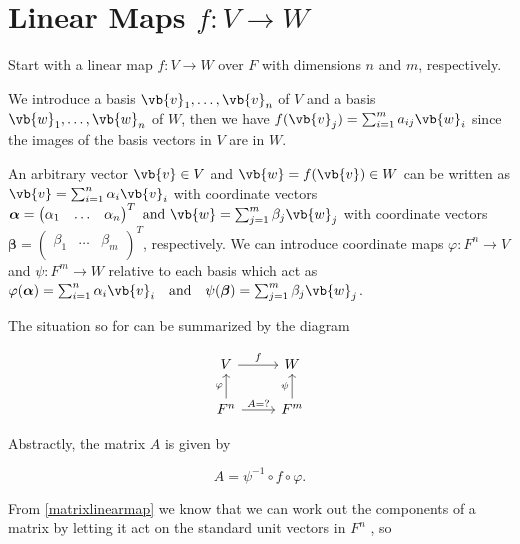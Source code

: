 \documentclass[a4paper,12pt]{report}
\begin{document}
\section{Linear Maps \(f: V \rightarrow W\)}

Start with a linear map \(f:V \rightarrow W\) over \(F\) with dimensions \(n\) and \(m\), respectively. 

We introduce a basis \(\vb{v}_{1}, \ldots, \vb{v}_n \) of \(V\) and a basis \(\vb{w}_{1}, \ldots, \vb{w}_n \) of \(W\), then we have \(f(\vb{v} _{j} ) = \sum_{i=1}^{m} a_{ij} \vb{w} _{i} \) since the images of the basis vectors in \(V\) are in \(W\). 

An arbitrary vector \(\vb{v} \in  V\) and \(\vb{w} = f(\vb{v} ) \in  W\) can be written as \(\vb{v} = \sum_{i=1}^{n} \alpha _{i}\vb{v} _{i}  \) with coordinate vectors \(\boldsymbol{\alpha } = \begin{pmatrix}
    \alpha _{1}  & \ldots  & \alpha _{n}   \\
\end{pmatrix}^{T} \text { and } \vb{w} = \sum_{j=1}^{m} \beta _{j} \vb{w} _{j}   \) with coordinate vectors \(\boldsymbol{\beta } = \begin{pmatrix}
    \beta _{1}  & \ldots  & \beta _{m}   \\
\end{pmatrix}^{T} \), respectively. We can introduce coordinate maps \(\varphi : F^{n} \rightarrow V \) and \(\psi  :F^{m} \rightarrow W\) relative to each basis which act as \(\varphi (\boldsymbol{\alpha } ) = \sum_{i=1}^{n} \alpha _{i} \vb{v} _{i} \text {~~ and ~~} \psi (\boldsymbol{\beta } ) = \sum_{j=1}^{m} \beta _{j} \vb{w} _{j}\).


The situation so for can be summarized by the diagram

\begin{equation}
    \begin{tikzcd}
        V \arrow[r, "f"] & W \\
        F^n \arrow[u, "\varphi"] \arrow[r, "A{=}?"] & F^m \arrow[u, "\psi"]
    \end{tikzcd}
\end{equation}

Abstractly, the matrix \(A\) is given by  

\begin{equation}
    A = \psi ^{-1} \circ f \circ \varphi.
\end{equation}

From \cref{matrixlinearmap} we know that we can work out the components of a matrix by letting it act on the standard unit vectors in \(F^{n} \) , so
\end{document}
